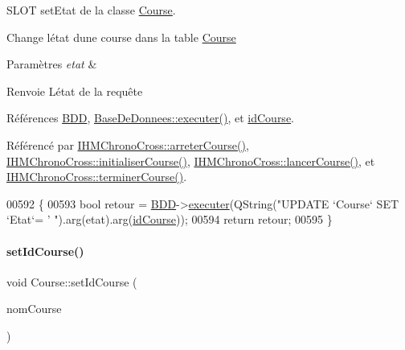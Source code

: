 S\+L\+OT set\+Etat de la classe \hyperlink{class_course}{Course}. 

Change l\textquotesingle{}état d\textquotesingle{}une course dans la table \hyperlink{class_course}{Course} 
\begin{DoxyParams}{Paramètres}
{\em etat} & \\
\hline
\end{DoxyParams}
\begin{DoxyReturn}{Renvoie}
L\textquotesingle{}état de la requête 
\end{DoxyReturn}


Références \hyperlink{class_course_a28a58b06494361b7a7eb81844d571dd4}{B\+DD}, \hyperlink{class_base_de_donnees_aa8de5f8f8bb17edc43f5c0ee33712081}{Base\+De\+Donnees\+::executer()}, et \hyperlink{class_course_a1f80798e50be6db9911a882a2491c698}{id\+Course}.



Référencé par \hyperlink{class_i_h_m_chrono_cross_ad3d8f287d08dd9aa0c6b10c9973672a4}{I\+H\+M\+Chrono\+Cross\+::arreter\+Course()}, \hyperlink{class_i_h_m_chrono_cross_adde019cc3799befac3fd9555e392eab9}{I\+H\+M\+Chrono\+Cross\+::initialiser\+Course()}, \hyperlink{class_i_h_m_chrono_cross_ace90922ce4c4ffeed6f1e8eb84c8c7a5}{I\+H\+M\+Chrono\+Cross\+::lancer\+Course()}, et \hyperlink{class_i_h_m_chrono_cross_ac89c6ec3040e8b787f1fbdb670405023}{I\+H\+M\+Chrono\+Cross\+::terminer\+Course()}.


\begin{DoxyCode}
00592 \{
00593     \textcolor{keywordtype}{bool} retour = \hyperlink{class_course_a28a58b06494361b7a7eb81844d571dd4}{BDD}->\hyperlink{class_base_de_donnees_aa8de5f8f8bb17edc43f5c0ee33712081}{executer}(QString(\textcolor{stringliteral}{"UPDATE `Course` SET `Etat`= '%
      "}).arg(etat).arg(\hyperlink{class_course_a1f80798e50be6db9911a882a2491c698}{idCourse}));
00594     \textcolor{keywordflow}{return} retour;
00595 \}
\end{DoxyCode}
\mbox{\label{class_course_a36cf16c971841431947b6fbe2b3f3d27}} 
\paragraph{\texorpdfstring{set\+Id\+Course()}{setIdCourse()}}
{\footnotesize\ttfamily void Course\+::set\+Id\+Course (\begin{DoxyParamCaption}\item[{Q\+String}]{nom\+Course }\end{DoxyParamCaption})}



